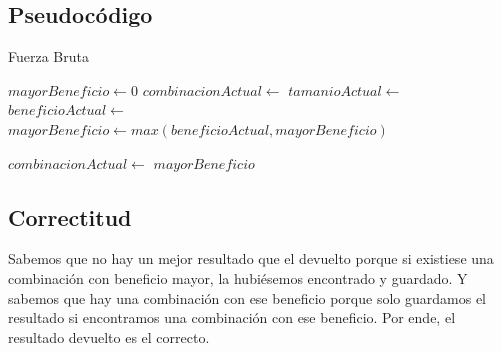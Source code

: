 \documentclass[10pt, a4paper]{article}
\begin{document}
\subsection{Pseudocódigo}
\begin{algorithm}
\caption{Fuerza Bruta}
\begin{algorithmic}[1]
	\State $mayorBeneficio \gets 0$
	\State $combinacionActual \gets $
		\State $tamanioActual \gets $
			\State $beneficioActual \gets $
			\State $mayorBeneficio \gets max(beneficioActual, mayorBeneficio)$
		\EndIf

		\State $combinacionActual \gets $
	\EndWhile
	\State \Return $mayorBeneficio$
\EndFunction
\end{algorithmic}
\end{algorithm}

\subsection{Correctitud}
Sabemos que no hay un mejor resultado que el devuelto porque si existiese una combinación con beneficio mayor, la hubiésemos encontrado y guardado. Y sabemos que hay una combinación con ese beneficio porque solo guardamos el resultado si encontramos una combinación con ese beneficio. Por ende, el resultado devuelto es el correcto. \par
\end{document}
